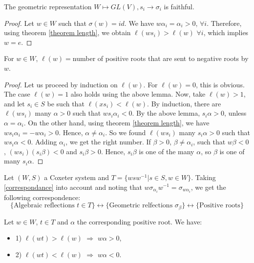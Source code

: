 \begin{corollary}
The geometric representation $W \mapsto GL(V), s_i \to \sigma_i$ is faithful.
\end{corollary}
\begin{proof}
Let $w \in W$ such that $\sigma(w) = id$. We have $w \alpha_i = \alpha_i > 0$, $\forall i$. Therefore, using theorem \ref{theorem length}, we obtain $\ell (w s_i) > \ell (w)$ $\forall i$, which implies $w = e$.
\end{proof}

\begin{proposition}
For $w \in W$, $\ell (w) = $number of positive roots that are sent to negative roots by $w$.
\end{proposition}
\begin{proof}
Let us proceed by induction on $\ell (w)$. For $\ell (w)= 0$, this is obvious. The case $\ell (w) = 1$ also holds using the above lemma. Now, take $\ell (w) > 1$, and let $s_i\in S$ be such that $\ell (x s_i) < \ell (w)$. By induction, there are $\ell (w s_i)$ many $\alpha > 0$ such that $w s_i \alpha_i < 0$. By the above lemma, $s_i \alpha > 0$, unless $ \alpha = \alpha_i$. On the other hand, using theorem \ref{theorem length}, we have $w s_i \alpha_i = - w \alpha_i > 0$. Hence, $\alpha \neq \alpha_i$. So we found $\ell (w s_i)$ many $s_i \alpha > 0$ such that $ws_i \alpha < 0$. Adding $\alpha_i$, we get the right number. If $\beta > 0$, $\beta \neq \alpha_i$, such that $w \beta < 0$, $(w s_i)(s_i \beta) < 0$ and $s_i \beta > 0$. Hence, $s_i \beta$ is one of the many $\alpha$, so $\beta$ is one of many $s_i \alpha$.
\end{proof}

\begin{remark}
Let $(W, S)$ a Coxeter system and $T = \{ w s w^{-1} | s \in S, w \in W \}$. Taking \eqref{correspondance} into account and noting that $w \sigma_{\alpha_i} w^{-1} = \sigma_{w \alpha_i}$, we get the following correspondence:
\begin{equation}
\{ \text{Algebraic reflections } t\in T \} \leftrightarrow \{\text{Geometric relfections }\sigma_\beta \} \leftrightarrow \{\text{Positive roots} \}
\end{equation}
\end{remark}

\begin{proposition}
Let $w \in W$, $t \in T$ and $\alpha$ the corresponding positive root. We have:
\begin{itemize}
\item 1) $\ell (wt) > \ell (w)$ $\Rightarrow$ $w \alpha > 0$,
\item 2) $\ell (wt) < \ell (w)$ $\Rightarrow$ $w \alpha < 0$.
\end{itemize}
\end{proposition}

